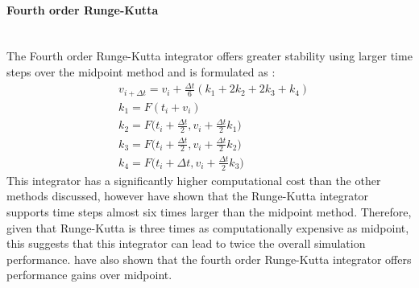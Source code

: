 \paragraph{Fourth order Runge-Kutta}\leavevmode\\
The Fourth order Runge-Kutta integrator offers greater stability using larger time steps over the midpoint method and is formulated as \parencite[3]{Wang2009a}:
\begin{equation}
\begin{split}
\label{eq:4th order rk}
  &v_{i + \Delta t} = v_{i} + \frac{\Delta t}{6}(k_{1} + 2k_{2} + 2k_{3} +  k_{4})
  \\&k_{1} = F(t_{i} + v_{i})
  \\&k_{2} = F\bigg(t_{i} + \frac{\Delta t}{2}, v_{i} + \frac{\Delta t}{2}k_{1}\bigg)
  \\&k_{3} = F\bigg(t_{i} + \frac{\Delta t}{2}, v_{i} + \frac{\Delta t}{2}k_{2}\bigg)
  \\&k_{4} = F\bigg(t_{i} + \Delta t, v_{i} + \frac{\Delta t}{2}k_{3}\bigg)
\end{split}
\end{equation}
This integrator has a significantly higher computational cost than the other methods discussed, however \textcite[4]{Volino2001} have shown that the Runge-Kutta integrator supports time steps almost six times larger than the midpoint method. Therefore, given that Runge-Kutta is three times as computationally expensive as midpoint, this suggests that this integrator can lead to twice the overall simulation performance. \textcite[4]{Wang2009a} have also shown that the fourth order Runge-Kutta integrator offers performance gains over midpoint.


